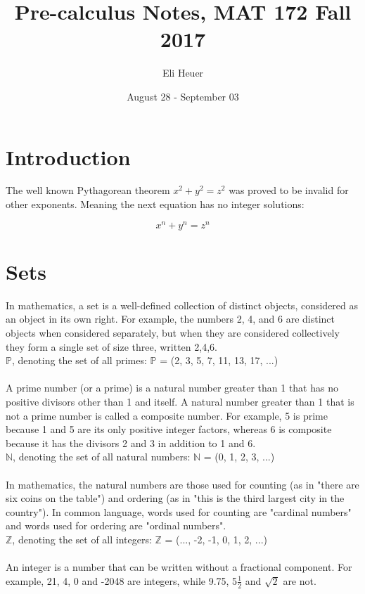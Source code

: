 \documentclass[12pt, letterpaper]{article}
\title{Pre-calculus Notes, MAT 172 Fall 2017}
\author{Eli Heuer}
\date{August 28 - September 03}
\begin{document}
\maketitle

\section{Introduction}

The well known Pythagorean theorem $x^2 + y^2 = z^2$ was proved to be invalid for other
exponents. Meaning the next equation has no integer solutions:

$$x^n+ y^n = z^n$$

\section{Sets}

In mathematics, a set is a well-defined collection of distinct objects, considered
as an object in its own right. For example, the numbers 2, 4, and 6 are distinct objects
when considered separately, but when they are considered collectively they form a single
set of size three, written {2,4,6}.
\\

\noindent$\mathbb{P}$, denoting the set of all primes: $\mathbb{P}$ = (2, 3, 5, 7, 11, 13, 17, ...)
\\\\
A prime number (or a prime) is a natural number greater than 1 that has no positive
divisors other than 1 and itself. A natural number greater than 1 that is not a prime
number is called a composite number. For example, 5 is prime because 1 and 5 are its
only positive integer factors, whereas 6 is composite because it has the divisors 2 and 3
in addition to 1 and 6.
\\

\noindent$\mathbb{N}$, denoting the set of all natural numbers: $\mathbb{N}$ =
(0, 1, 2, 3, ...)
\\\\
In mathematics, the natural numbers are those used for counting (as in "there are six coins
on the table") and ordering (as in "this is the third largest city in the country").
In common language, words used for counting are "cardinal numbers" and words used for
ordering are "ordinal numbers".
\\

\noindent$\mathbb{Z}$, denoting the set of all integers: $\mathbb{Z}$ =
(..., -2, -1, 0, 1, 2, ...)
\\\\
An integer is a number that can be written without a fractional component.
For example, 21, 4, 0 and -2048 are integers, while 9.75, 5$\frac{1}{2}$ and $\sqrt{2}$ are not.
\\
\end{document}
